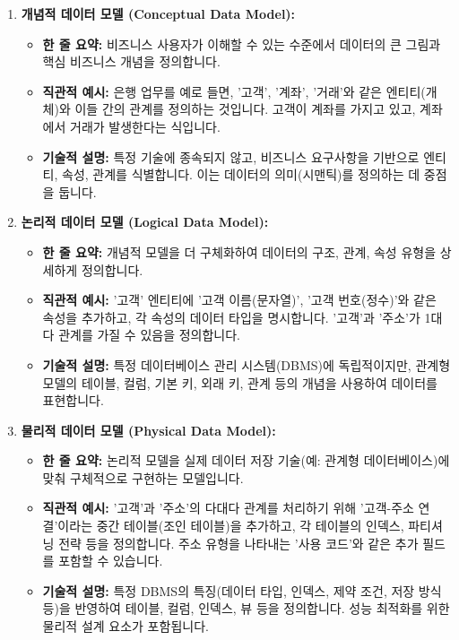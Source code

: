 \documentclass[11pt,a4paper]{article}
\begin{document}
\begin{enumerate}
    \item \textbf{개념적 데이터 모델 (Conceptual Data Model):}
    \begin{itemize}
        \item \textbf{한 줄 요약:} 비즈니스 사용자가 이해할 수 있는 수준에서 데이터의 큰 그림과 핵심 비즈니스 개념을 정의합니다.
        \item \textbf{직관적 예시:} 은행 업무를 예로 들면, '고객', '계좌', '거래'와 같은 엔티티(개체)와 이들 간의 관계를 정의하는 것입니다. 고객이 계좌를 가지고 있고, 계좌에서 거래가 발생한다는 식입니다.
        \item \textbf{기술적 설명:} 특정 기술에 종속되지 않고, 비즈니스 요구사항을 기반으로 엔티티, 속성, 관계를 식별합니다. 이는 데이터의 의미(시맨틱)를 정의하는 데 중점을 둡니다.
    \end{itemize}

    \item \textbf{논리적 데이터 모델 (Logical Data Model):}
    \begin{itemize}
        \item \textbf{한 줄 요약:} 개념적 모델을 더 구체화하여 데이터의 구조, 관계, 속성 유형을 상세하게 정의합니다.
        \item \textbf{직관적 예시:} '고객' 엔티티에 '고객 이름(문자열)', '고객 번호(정수)'와 같은 속성을 추가하고, 각 속성의 데이터 타입을 명시합니다. '고객'과 '주소'가 1대 다 관계를 가질 수 있음을 정의합니다.
        \item \textbf{기술적 설명:} 특정 데이터베이스 관리 시스템(DBMS)에 독립적이지만, 관계형 모델의 테이블, 컬럼, 기본 키, 외래 키, 관계 등의 개념을 사용하여 데이터를 표현합니다.
    \end{itemize}

    \item \textbf{물리적 데이터 모델 (Physical Data Model):}
    \begin{itemize}
        \item \textbf{한 줄 요약:} 논리적 모델을 실제 데이터 저장 기술(예: 관계형 데이터베이스)에 맞춰 구체적으로 구현하는 모델입니다.
        \item \textbf{직관적 예시:} '고객'과 '주소'의 다대다 관계를 처리하기 위해 '고객-주소 연결'이라는 중간 테이블(조인 테이블)을 추가하고, 각 테이블의 인덱스, 파티셔닝 전략 등을 정의합니다. 주소 유형을 나타내는 '사용 코드'와 같은 추가 필드를 포함할 수 있습니다.
        \item \textbf{기술적 설명:} 특정 DBMS의 특징(데이터 타입, 인덱스, 제약 조건, 저장 방식 등)을 반영하여 테이블, 컬럼, 인덱스, 뷰 등을 정의합니다. 성능 최적화를 위한 물리적 설계 요소가 포함됩니다.
    \end{itemize}
\end{enumerate}
\end{document}
